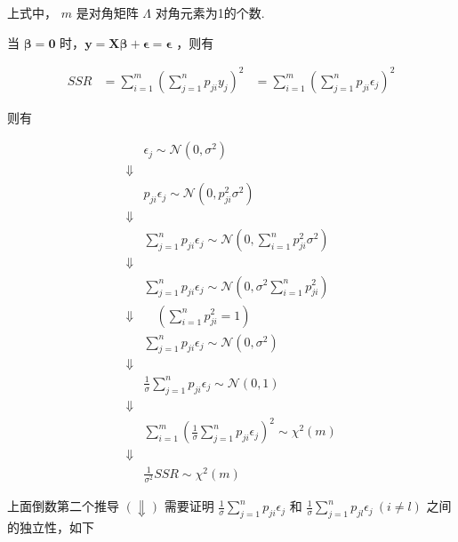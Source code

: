 \documentclass[UTF8]{ctexart}
\begin{document}
    上式中， $ m $ 是对角矩阵 $ \boldsymbol{\varLambda} $ 对角元素为1的个数.
    
    
    当 $ \boldsymbol{\beta} = \boldsymbol{0}$ 时，$ \boldsymbol{y} = \boldsymbol{X} \boldsymbol{\beta} + \boldsymbol{\epsilon} = \boldsymbol{\epsilon} $ ，则有
    
    \begin{equation}
    	\begin{aligned}
    		SSR & = \sum_{i=1}^{m}{(\sum_{j=1}^{n}{p_{ji} y_{j}})^2}
    		& = \sum_{i=1}^{m}{(\sum_{j=1}^{n}{p_{ji} \epsilon_{j}})^2}
    	\end{aligned}
    \end{equation}

    则有
    
    \begin{equation}
        \begin{aligned}
        	& \epsilon_{j} \sim \mathcal{N}(0, \sigma^2) \\
        	\Downarrow & \\
        	& p_{ji} \epsilon_{j} \sim \mathcal{N}(0, p_{ji}^2 \sigma^2) \\
        	\Downarrow & \\
        	& \sum_{j=1}^{n}{p_{ji} \epsilon_{j}} \sim \mathcal{N}(0, \sum_{i=1}^{n}p_{ji}^2 \sigma^2) \\
        	\Downarrow & \\
        	& \sum_{j=1}^{n}{p_{ji} \epsilon_{j}} \sim \mathcal{N}(0, \sigma^2 \sum_{i=1}^{n}p_{ji}^2) \\
        	\Downarrow & \quad (\sum_{i=1}^{n}p_{ji}^2 = 1) \\
        	& \sum_{j=1}^{n}{p_{ji} \epsilon_{j}} \sim \mathcal{N}(0, \sigma^2) \\
        	\Downarrow & \\
        	& \frac{1}{\sigma} \sum_{j=1}^{n}{p_{ji} \epsilon_{j}} \sim \mathcal{N}(0, 1) \\
        	\Downarrow & \\ 
        	& \sum_{i=1}^{m}{(\frac{1}{\sigma} \sum_{j=1}^{n}{p_{ji} \epsilon_{j}})^2} \sim \mathcal{\chi}^2(m) \\
        	\Downarrow & \\
        	& \frac{1}{\sigma^2} SSR \sim \mathcal{\chi}^2(m)
        \end{aligned}
    \end{equation}

    上面倒数第二个推导 $ (\Downarrow) $ 需要证明 $ \frac{1}{\sigma} \sum_{j=1}^{n}{p_{ji} \epsilon_{j}} $ 和 $ \frac{1}{\sigma} \sum_{j=1}^{n}{p_{jl} \epsilon_{j}} \ (i \ne l)$ 之间的独立性，如下
    
\end{document}
